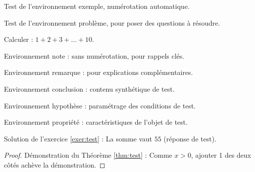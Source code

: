 \documentclass[fr]{../../elegantbook}
\begin{document}
\begin{definition}
\begin{theorem}
\begin{lemma}
\begin{corollary}
\begin{axiom}
\begin{postulate}
\begin{proposition}
\begin{example}\label{exa:test}
Test de l'environnement exemple, numérotation automatique.
\end{example}

\begin{problem}\label{probl:test}
Test de l'environnement problème, pour poser des questions à résoudre.
\end{problem}

\begin{exercise}\label{exer:test}
Calculer : $1+2+3+\dots+10$.
\end{exercise}

\begin{note}
Environnement note : sans numérotation, pour rappels clés.
\end{note}

\begin{remark}
Environnement remarque : pour explications complémentaires.
\end{remark}

\begin{conclusion}
Environnement conclusion : contenu synthétique de test.
\end{conclusion}

\begin{assumption}
Environnement hypothèse : paramétrage des conditions de test.
\end{assumption}

\begin{property}
Environnement propriété : caractéristiques de l'objet de test.
\end{property}

\begin{solution}
Solution de l'exercice \ref{exer:test} : La somme vaut $55$ (réponse de test).
\end{solution}

\begin{proof}
Démonstration du Théorème \ref{thm:test} : Comme $x>0$, ajouter 1 des deux côtés achève la démonstration.
\end{proof}


\end{proposition}
\end{postulate}
\end{axiom}
\end{corollary}
\end{lemma}
\end{theorem}
\end{definition}
\end{document}
